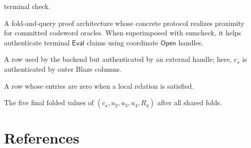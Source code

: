 \begin{description}[leftmargin=0.3in,style=nextline]
        terminal check.
  \item[BaseFold.]
        A fold-and-query proof architecture whose concrete protocol realizes
        proximity for committed codeword oracles.  When superimposed with
        sumcheck, it helps authenticate terminal \(\mathsf{Eval}\) claims using
        coordinate \(\mathsf{Open}\) handles.
  \item[Holographic row.]
        A row used by the backend but authenticated by an external handle;
        here, $c_\star$ is authenticated by outer Blaze columns.
  \item[Residual.]
        A row whose entries are zero when a local relation is satisfied.
  \item[Terminal vector.]
        The five final folded values of
        $(c_\star,u_2,u_3,u_4,R_\eta)$ after all shared folds.
\end{description}

\section{References}

